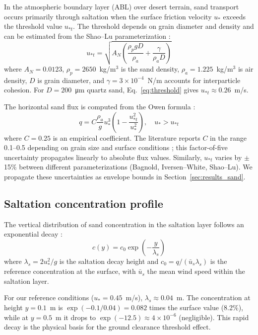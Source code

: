\documentclass[preprint,12pt,review]{elsarticle}
\begin{document}
In the atmospheric boundary layer (ABL) over desert terrain, sand transport occurs primarily through saltation when the surface friction velocity $u_*$ exceeds the threshold value $u_{*t}$. The threshold depends on grain diameter and density and can be estimated from the Shao--Lu parameterization \cite{shao2000simple}:
%
\begin{equation}
  u_{*t} = \sqrt{A_N \left(\frac{\rho_p g D}{\rho_a} + \frac{\gamma}{\rho_a D}\right)}
  \label{eq:threshold}
\end{equation}
%
where $A_N = 0.0123$, $\rho_p = 2650$~kg/m$^3$ is the sand density, $\rho_a = 1.225$~kg/m$^3$ is air density, $D$ is grain diameter, and $\gamma = 3 \times 10^{-4}$~N/m accounts for interparticle cohesion. For $D = 200$~\si{\micro\metre} quartz sand, Eq.~\eqref{eq:threshold} gives $u_{*t} \approx 0.26$~m/s.

The horizontal sand flux is computed from the Owen formula \cite{owen1964saltation}:
%
\begin{equation}
  q = C \frac{\rho_a}{g} u_*^3 \left(1 - \frac{u_{*t}^2}{u_*^2}\right), \quad u_* > u_{*t}
  \label{eq:flux}
\end{equation}
%
where $C = 0.25$ is an empirical coefficient. The literature reports $C$ in the range 0.1--0.5 depending on grain size and surface conditions \cite{shao2008physics}; this factor-of-five uncertainty propagates linearly to absolute flux values. Similarly, $u_{*t}$ varies by $\pm$15\% between different parameterizations (Bagnold, Iversen--White, Shao--Lu). We propagate these uncertainties as envelope bounds in Section~\ref{sec:results_sand}.

\subsection{Saltation concentration profile}

The vertical distribution of sand concentration in the saltation layer follows an exponential decay \cite{anderson1991review,zheng2009mechanics}:
%
\begin{equation}
  c(y) = c_0 \exp\!\left(-\frac{y}{\lambda_s}\right)
  \label{eq:concentration}
\end{equation}
%
where $\lambda_s = 2u_*^2/g$ is the saltation decay height and $c_0 = q / (\bar{u}_s \lambda_s)$ is the reference concentration at the surface, with $\bar{u}_s$ the mean wind speed within the saltation layer.

For our reference conditions ($u_* = 0.45$~m/s), $\lambda_s \approx 0.04$~m. The concentration at height $y = 0.1$~m is $\exp(-0.1/0.04) = 0.082$ times the surface value (8.2\%), while at $y = 0.5$~m it drops to $\exp(-12.5) \approx 4 \times 10^{-6}$ (negligible). This rapid decay is the physical basis for the ground clearance threshold effect.
\end{document}
